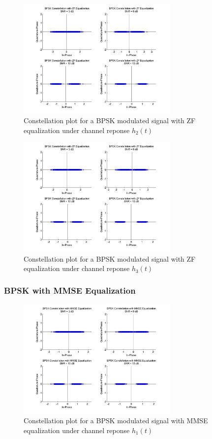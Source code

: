 \documentclass[]{article}
\begin{document}
\begin{figure}[H]
\centering
\includegraphics[width=0.7\textwidth]{bpConstZF2.jpg}
\caption{Constellation plot for a BPSK modulated signal with ZF equalization under channel reponse $h_2(t)$}
\end{figure}

\begin{figure}[H]
\centering
\includegraphics[width=0.7\textwidth]{bpConstZF3.jpg}
\caption{Constellation plot for a BPSK modulated signal with ZF equalization under channel reponse $h_3(t)$}
\end{figure}

\subsubsection{BPSK with MMSE Equalization}

\begin{figure}[H]
\centering
\includegraphics[width=0.7\textwidth]{bpConstMMSE1.jpg}
\caption{Constellation plot for a BPSK modulated signal with MMSE equalization under channel reponse $h_1(t)$}
\end{figure}
\end{document}
